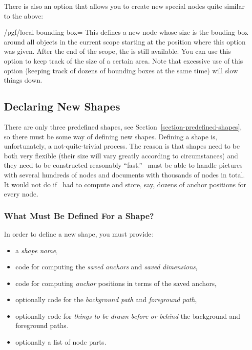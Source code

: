 There is also an option that allows you to create new special nodes
quite similar to the above:
\begin{key}{/pgf/local bounding box=}
  This defines a new node  whose size is the bouding
  box around all objects in the current scope starting at the position
  where this option was given. After the end of the scope, the  is still available. You can use this option to keep track of
  the size of a certain area. Note that excessive use of this option
  (keeping track of dozens of bounding boxes at the same time)
  will slow things down.
\begin{codeexample}[]
\end{codeexample}
\end{key}


\subsection{Declaring New Shapes}

There are only three predefined shapes, see
Section~\ref{section-predefined-shapes}, so there must be some way of
defining new shapes. Defining a shape is, unfortunately, a
not-quite-trivial process. The reason is that shapes need to be both
very flexible (their size will vary greatly according to
circumstances) and they need to be constructed reasonably ``fast.''
\pgfname\ must be able to handle pictures with several hundreds of
nodes and documents with thousands of nodes in total. It would not do
if \pgfname\ had to compute and store, say, dozens of anchor positions
for every node. 


\subsubsection{What Must Be Defined For a Shape?}

In order to define a new shape, you must provide:
\begin{itemize}
\item
  a \emph{shape name},
\item
  code for computing the  \emph{saved anchors} and \emph{saved
    dimensions}, 
\item
  code for computing \emph{anchor} positions in terms of the saved anchors,
\item
  optionally code for the \emph{background path} and \emph{foreground path},
\item
  optionally code for \emph{things to be drawn before or behind} the
  background and foreground paths.
\item
  optionally a list of node parts.
\end{itemize}


